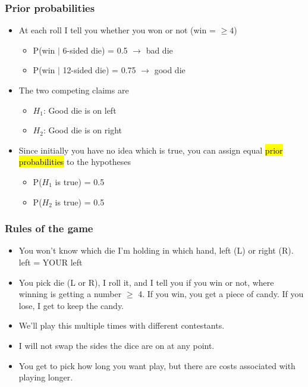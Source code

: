 \documentclass[slidestop,compress,mathserif,11pt,t,professionalfonts,xcolor=table]{beamer}
\begin{document}
\begin{frame}
\frametitle{Prior probabilities}

\begin{itemize}

\item At each roll I tell you whether you won or not (win = $\ge 4$)
\begin{itemize}
\item P(win $\mid$ 6-sided die) = 0.5 $\rightarrow$ bad die
\item P(win $\mid$ 12-sided die) = 0.75 $\rightarrow$ good die
\end{itemize}

\pause

\item The two competing claims are
\begin{itemize}
\item[] $H_1$: Good die is on left 
\item[] $H_2$: Good die is on right 
\end{itemize}

\pause

\item Since initially you have no idea which is true, you can assign equal \hl{prior probabilities} to the hypotheses
\begin{itemize}
\item[] P($H_1$ is true) = 0.5 
\item[] P($H_2$ is true) = 0.5 
\end{itemize}

\end{itemize}

\end{frame}


\begin{frame}
\frametitle{Rules of the game}

\begin{itemize}

\item You won't know which die I'm holding in which hand, left (L) or right (R). {\footnotesize left = YOUR left}

\item You pick die (L or R), I roll it, and I tell you if you win or not, where winning is getting a number $\ge$ 4. If you win, you get a piece of candy. If you lose, I get to keep the candy.

\item We'll play this multiple times with different contestants.

\item I will not swap the sides the dice are on at any point.

\item You get to pick how long you want play, but there are costs associated with playing longer.

\end{itemize}

\end{frame}
\end{document}
